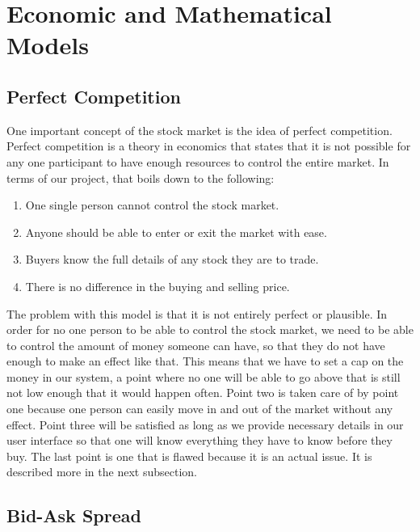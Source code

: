 \section{Economic and Mathematical Models}

\subsection{Perfect Competition}

One important concept of the stock market is the idea of perfect competition. Perfect competition is a theory in economics that states that it is not possible for any one participant to have enough resources to control the entire market. In terms of our project, that boils down to the following:
\begin{enumerate}
\item
One single person cannot control the stock market.\cite{inv:pcomp} 
\item
Anyone should be able to enter or exit the market with ease.
\item
Buyers know the full details of any stock they are to trade.
\item
There is no difference in the buying and selling price.\cite{wiki:pcomp}
\end{enumerate}
The problem with this model is that it is not entirely perfect or plausible. In order for no one person to be able to control the stock market, we need to be able to control the amount of money someone can have, so that they do not have enough to make an effect like that. This means that we have to set a cap on the money in our system, a point where no one will be able to go above that is still not low enough that it would happen often. Point two is taken care of by point one because one person can easily move in and out of the market without any effect. Point three will be satisfied as long as we provide necessary details in our user interface so that one will know everything they have to know before they buy. The last point is one that is flawed because it is an actual issue. It is described more in the next subsection.

\subsection{Bid-Ask Spread}

